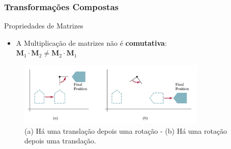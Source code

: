 \documentclass{beamer}
\begin{document}
\begin{frame}
\frametitle{Transformações Compostas}
	\begin{block}{Propriedades de Matrizes}
		\begin{itemize}
			\item<1-> A Multiplicação de matrizes não é \textbf{comutativa}:\\
			$\textbf{M}_1 \cdot \textbf{M}_2 \neq \textbf{M}_2 \cdot \textbf{M}_1$ 
			
		\end{itemize}
	\end{block}
	
	\begin{figure}[!h]
		\begin{center}
			\includegraphics[width=0.8\textwidth]{Figures/comutatividade}
			\caption{(a) Há uma translação depois uma rotação - (b) Há uma rotação depois uma translação.}
		\end{center}
	\end{figure}
	
	
\end{frame}
\end{document}
